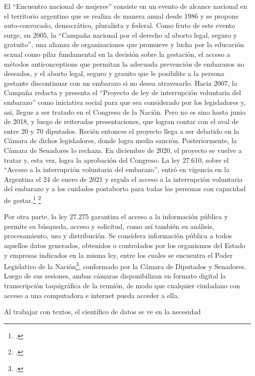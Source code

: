 El ``Encuentro nacional de mujeres'' consiste en un evento de alcance nacional
en el territorio argentino que se realiza de manera anual desde 1986 y se propone
auto-convocado, democr\'atico, pluralista y federal.
Como fruto de este evento surge, en 2005, la ``Campaña nacional por el derecho al
aborto legal, seguro y gratuito'', una alianza de organizaciones que promueve y
lucha por la educaci\'on sexual como pilar fundamental en la decisi\'on sobre la gestaci\'on,
el acceso a m\'etodos anticonceptions que permitan la adecuada prevenci\'on de embarazos
no deseados, y el aborto legal, seguro y grauito que le posibilite a la persona gestante
discontinuar con un embarazo si no desea atravesarlo.
Hacia 2007, la Campaña redacta y presenta el ``Proyecto de ley de interrupci\'on
voluntaria del embarazo'' como iniciativa social para que sea considerado por los
legisladores y, as\'i, llegue a ser tratado en el Congreso de la Naci\'on.
Pero no es sino hasta junio de 2018, y luego de reiteradas presentaciones, que logran
contar con el aval de entre 20 y 70 diputados. Reci\'en entonces el proyecto llega a
ser debatido en la C\'amara de dichos legisladores, donde logra media sanci\'on.
Posteriormente, la C\'amara de Senadores lo rechaza.
En diciembre de 2020, el proyecto se vuelve a tratar y, esta vez, logra la aprobaci\'on
del Congreso.
La ley 27.610, sobre el ``Acceso a la interrupci\'on voluntaria del embarazo'', entr\'o
en vigencia en la Argentina el 24 de enero de 2021 y regula el acceso a la
interrupci\'on voluntaria del embarazo y a los cuidados postaborto para todas
las personas con capacidad de gestar.\footnote{\citeauthor{campana@lalucha}.}
\footnote{\citeauthor{huesped@historia}.}
\par
Por otra parte, la ley 27.275 garantiza el acceso a la informaci\'on p\'ublica y permite su b\'usqueda,
acceso y solicitud, como as\'i tambi\'en su an\'alisis, procesamiento, uso y distribuci\'on.
Se considera informaci\'on p\'ublica a todos aquellos datos generados, obtenidos o
controlados por los organismos del Estado y empresas indicados en la misma ley, entre
los cuales se encuentra el Poder Legislativo de la
Naci\'on\footnote{\citeauthor{minjusticia@accesoinfo}.}, conformado por la C\'amara
de Diputados y Senadores.
Luego de sus sesiones, ambas c\'amaras disponibilizan en formato digital la
transcripci\'on taquigr\'afica de la reuni\'on, de modo que cualquier ciudadano con
acceso a una computadora e internet pueda acceder a ella.
\par
Al trabajar con textos, el cient\'ifico de datos se ve en la necesidad
